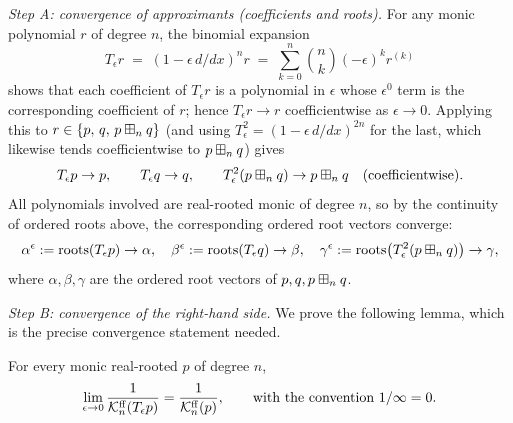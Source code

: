 \medskip
\noindent\textit{Step A: convergence of approximants (coefficients and roots).}
For any monic polynomial $r$ of degree $n$, the binomial expansion
\[
T_\epsilon r \;=\; (1-\epsilon\,d/dx)^n r \;=\; \sum_{k=0}^{n}\binom{n}{k}(-\epsilon)^k r^{(k)}
\]
shows that each coefficient of $T_\epsilon r$ is a polynomial in $\epsilon$ whose
$\epsilon^0$ term is the corresponding coefficient of $r$; hence
$T_\epsilon r\to r$ coefficientwise as $\epsilon\to 0$. Applying this to
$r\in\{p,\,q,\,p\boxplus_n q\}$ (and using $T_\epsilon^2=(1-\epsilon\,d/dx)^{2n}$ for
the last, which likewise tends coefficientwise to $p\boxplus_n q$) gives
\[
T_\epsilon p\to p,\qquad T_\epsilon q\to q,\qquad T_\epsilon^2(p\boxplus_n q)\to p\boxplus_n q
\quad\text{(coefficientwise).}
\]
All polynomials involved are real-rooted monic of degree $n$, so by the
continuity of ordered roots above, the corresponding ordered root vectors
converge:
\[
\alpha^\epsilon:=\mathrm{roots}(T_\epsilon p)\to\alpha,\quad
\beta^\epsilon:=\mathrm{roots}(T_\epsilon q)\to\beta,\quad
\gamma^\epsilon:=\mathrm{roots}\bigl(T_\epsilon^2(p\boxplus_n q)\bigr)\to\gamma,
\]
where $\alpha,\beta,\gamma$ are the ordered root vectors of $p,q,p\boxplus_n q$.

\medskip
\noindent\textit{Step B: convergence of the right-hand side.}
We prove the following lemma, which is the precise convergence statement needed.

\begin{qfourlemma}\label{lem:Bconv}
For every monic real-rooted $p$ of degree $n$,
\[
\lim_{\epsilon\to 0}\frac{1}{\mathcal{K}^{\mathrm{ff}}_n(T_\epsilon p)}=\frac{1}{\mathcal{K}^{\mathrm{ff}}_n(p)},
\qquad\text{with the convention }1/\infty=0 .
\]
\end{qfourlemma}

